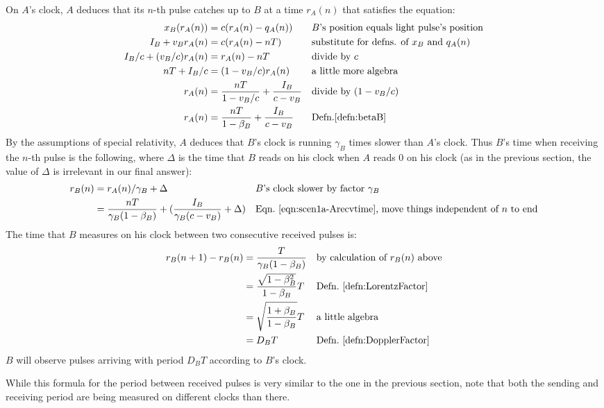 \documentclass[a4paper]{article}
\theoremstyle{plain}
\theoremstyle{definition}
\begin{document}
On $A$'s clock, $A$ deduces that
its $n$-th pulse catches up to $B$ at a time $r_A(n)$ that satisfies the equation:
\begin{align}
x_B(r_A(n)) & = c(r_A(n) - q_A(n)) & & \text{$B$'s position equals light pulse's position} \nonumber \\
I_B + v_B r_A(n) & = c(r_A(n) - nT) & & \text{substitute for defns. of $x_B$ and $q_A(n)$} \\
I_B/c + (v_B/c) r_A(n) & = r_A(n) - nT & & \text{divide by $c$} \nonumber \\
nT + I_B/c & = (1 - v_B/c) r_A(n) & & \text{a little more algebra} \nonumber \\
r_A(n) & = \frac{nT}{1 - v_B/c} + \frac{I_B}{c-v_B} & & \text{divide by $(1-v_B/c)$} \nonumber \\
r_A(n) & = \frac{nT}{1 - \beta_B} + \frac{I_B}{c-v_B} & & \text{Defn.\eqref{defn:betaB}} \label{eqn:scen1a-Arecvtime}
\end{align}
By the assumptions of special relativity, $A$ deduces that $B$'s clock
is running $\gamma_B$ times slower than $A$'s clock.
Thus $B$'s time when receiving the $n$-th pulse is
the following, where $\Delta$ is the time that $B$ reads on his clock
when $A$ reads 0 on his clock (as in the previous section,
the value of $\Delta$ is irrelevant in our final answer):
\begin{align*}
r_B(n) & = r_A(n) / \gamma_B + \Delta & & \text{$B$'s clock slower by factor $\gamma_B$} \\
       & = \frac{nT}{\gamma_B(1 - \beta_B)} + (\frac{I_B}{\gamma_B(c-v_B)} + \Delta) & & \text{Eqn.~\eqref{eqn:scen1a-Arecvtime}, move things independent of $n$ to end}
\end{align*}
The time that $B$ measures on his clock between two consecutive received
pulses is:
\begin{align*}
r_B(n+1) - r_B(n)
  & = \frac{T}{\gamma_B(1 - \beta_B)} & & \text{by calculation of $r_B(n)$ above} \\
  & = \frac{\sqrt{1 - \beta_B^2}}{1 - \beta_B} T & & \text{Defn.~\eqref{defn:LorentzFactor}} \\
  & = \sqrt{ \frac{1 + \beta_B}{1 - \beta_B} } T & & \text{a little algebra} \\
  & = D_B T & & \text{Defn.~\eqref{defn:DopplerFactor}}
\end{align*}
$B$ will observe pulses arriving with period $D_B T$ according to
$B$'s clock.

While this formula for the period between received pulses
is very similar to the one in the previous section, note that
both the sending and receiving period are being measured on different
clocks than there.
\end{document}
